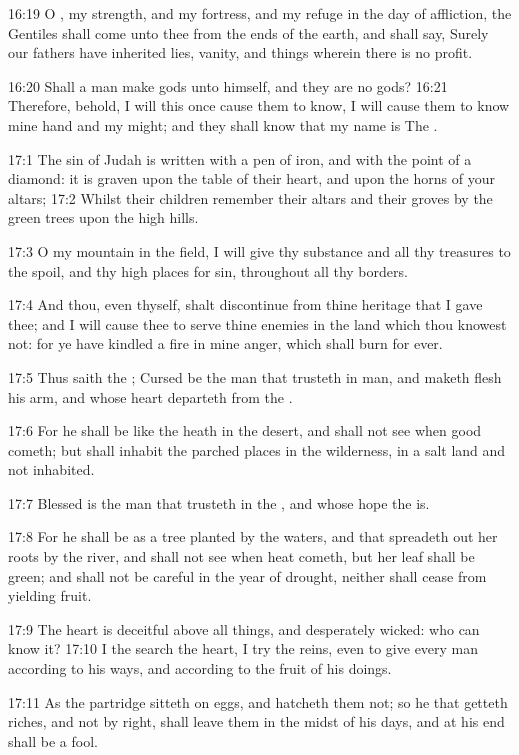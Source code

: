 16:19 O \LORD, my strength, and my fortress, and my refuge in the day
of affliction, the Gentiles shall come unto thee from the ends of the
earth, and shall say, Surely our fathers have inherited lies, vanity,
and things wherein there is no profit.

16:20 Shall a man make gods unto himself, and they are no gods?  16:21
Therefore, behold, I will this once cause them to know, I will cause
them to know mine hand and my might; and they shall know that my name
is The \LORD.

17:1 The sin of Judah is written with a pen of iron, and with the
point of a diamond: it is graven upon the table of their heart, and
upon the horns of your altars; 17:2 Whilst their children remember
their altars and their groves by the green trees upon the high hills.

17:3 O my mountain in the field, I will give thy substance and all thy
treasures to the spoil, and thy high places for sin, throughout all
thy borders.

17:4 And thou, even thyself, shalt discontinue from thine heritage
that I gave thee; and I will cause thee to serve thine enemies in the
land which thou knowest not: for ye have kindled a fire in mine anger,
which shall burn for ever.

17:5 Thus saith the \LORD; Cursed be the man that trusteth in man, and
maketh flesh his arm, and whose heart departeth from the \LORD.

17:6 For he shall be like the heath in the desert, and shall not see
when good cometh; but shall inhabit the parched places in the
wilderness, in a salt land and not inhabited.

17:7 Blessed is the man that trusteth in the \LORD, and whose hope the
\LORD is.

17:8 For he shall be as a tree planted by the waters, and that
spreadeth out her roots by the river, and shall not see when heat
cometh, but her leaf shall be green; and shall not be careful in the
year of drought, neither shall cease from yielding fruit.

17:9 The heart is deceitful above all things, and desperately wicked:
who can know it?  17:10 I the \LORD search the heart, I try the reins,
even to give every man according to his ways, and according to the
fruit of his doings.

17:11 As the partridge sitteth on eggs, and hatcheth them not; so he
that getteth riches, and not by right, shall leave them in the midst
of his days, and at his end shall be a fool.

